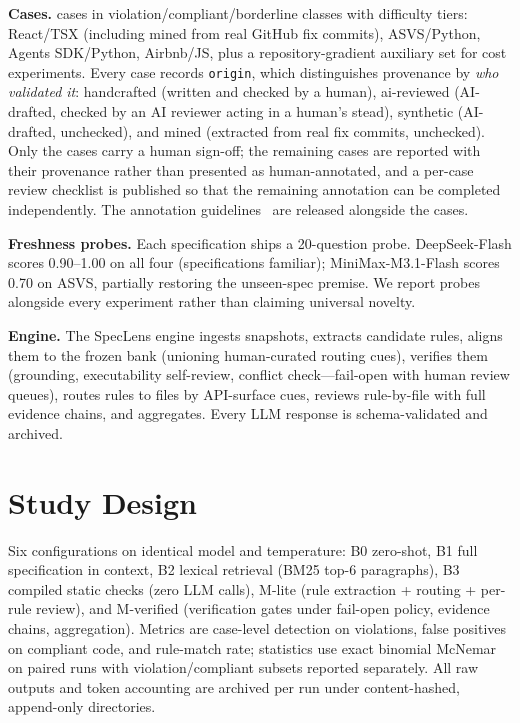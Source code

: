 \documentclass[11pt]{article}
\begin{document}
\textbf{Cases.} \benchN{} cases in violation/compliant/borderline classes with
difficulty tiers: \nReact{} React/TSX (including \reactNMined{} mined from real
GitHub fix commits), \nAsvs{} ASVS/Python, \nAgents{} Agents SDK/Python,
\nAirbnb{} Airbnb/JS, plus a
repository-gradient auxiliary set for cost experiments. Every case records
\texttt{origin}, which distinguishes provenance by \emph{who validated it}:
handcrafted \benchNHand (written and checked by a human), ai-reviewed
\benchNAiRev (AI-drafted, checked by an AI reviewer acting in a human's stead),
synthetic \benchNSyn (AI-drafted, unchecked), and mined \benchNMined
(extracted from real fix commits, unchecked). Only the \benchNHand{} cases
carry a human sign-off; the remaining \benchN{} cases are reported with their
provenance rather than presented as human-annotated, and a per-case review
checklist is published so that the remaining annotation can be completed
independently. The annotation guidelines~\cite{annotationguide} are released
alongside the cases.

\textbf{Freshness probes.} Each specification ships a 20-question probe.
DeepSeek-Flash scores 0.90--1.00 on all four (specifications familiar);
MiniMax-M3.1-Flash scores 0.70 on ASVS, partially restoring the unseen-spec
premise. We report probes alongside every experiment rather than claiming
universal novelty.

\textbf{Engine.} The SpecLens engine ingests snapshots, extracts candidate
rules, aligns them to the frozen bank (unioning human-curated routing cues),
verifies them (grounding, executability self-review, conflict check---fail-open
with human review queues), routes rules to files by API-surface cues, reviews
rule-by-file with full evidence chains, and aggregates. Every LLM response is
schema-validated and archived.

\section{Study Design}
Six configurations on identical model and temperature: B0 zero-shot, B1 full
specification in context, B2 lexical retrieval (BM25 top-6 paragraphs), B3
compiled static checks (zero LLM calls), M-lite (rule extraction + routing +
per-rule review), and M-verified (verification gates under fail-open policy,
evidence chains, aggregation). Metrics are case-level detection on violations,
false positives on compliant code, and rule-match rate; statistics use exact
binomial McNemar on paired runs with violation/compliant subsets reported
separately. All raw outputs and token accounting are archived per run under
content-hashed, append-only directories.
\end{document}
